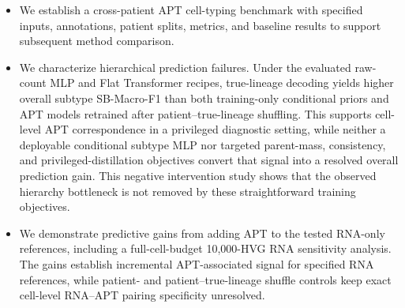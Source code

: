 \begin{itemize}
\item We establish a cross-patient APT cell-typing benchmark with
specified inputs, annotations, patient splits, metrics, and baseline
results to support subsequent method comparison.

\item We characterize hierarchical prediction failures. Under the
evaluated raw-count MLP and Flat Transformer recipes, true-lineage decoding
yields higher overall subtype SB-Macro-F1 than both training-only conditional
priors and APT models retrained after patient--true-lineage shuffling.
This supports cell-level APT correspondence in a privileged diagnostic setting,
while neither a deployable conditional subtype MLP nor targeted parent-mass,
consistency, and privileged-distillation objectives convert that signal into a
resolved overall prediction gain. This negative intervention study shows that
the observed hierarchy bottleneck is not removed by these straightforward
training objectives.

\item We demonstrate predictive gains from adding APT to the tested
RNA-only references, including a full-cell-budget 10{,}000-HVG RNA sensitivity
analysis. The gains establish incremental APT-associated signal for specified
RNA references, while patient- and patient--true-lineage shuffle controls keep
exact cell-level RNA--APT pairing specificity unresolved.
\end{itemize}
